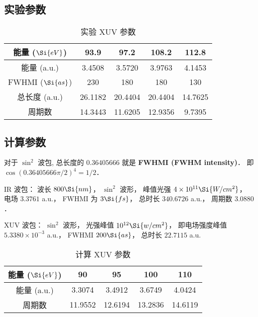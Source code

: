
\subsection{实验参数}
\begin{table}[ht]
\centering
\caption{实验 XUV 参数}\label{Osiand_tab1}
\begin{tabular}{|c|c|c|c|c|}
\hline
能量 ($\Si{eV}$) & 93.9 & 97.2 & 108.2 & 112.8 \\
\hline
能量 (a.u.) & 3.4508 & 3.5720 & 3.9763 & 4.1453 \\
\hline
FWHMI ($\Si{as}$) & 230 & 180 & 180 & 130 \\
\hline
总长度 (a.u.) & 26.1182 & 20.4404 & 20.4404 & 14.7625 \\
\hline
周期数 & 14.3443 & 11.6205 & 12.9356 & 9.7395 \\
\hline
\end{tabular}
\end{table}

\subsection{计算参数}

对于 $\sin^2$ 波包, 总长度的 $0.36405666$ 就是 \textbf{FWHMI (FWHM intensity)}． 即 $\cos(0.36405666 \pi/ 2)^4 = 1/2$．

IR 波包： 波长 $800\Si{nm}$， $\sin^2$ 波形， 峰值光强 $4\times 10^{11} \Si{W/cm^2}$， 电场 $3.3761$ a.u.， FWHMI 为 $3 \Si{fs}$， 总时长 $340.6726$ a.u.， 周期数 $3.0880$．

XUV 波包： $\sin^2$ 波形， 光强峰值 $10^{12} \Si{w/cm^2}$， 即电场强度峰值 $5.3380\times 10^{-3}$ a.u.， FWHMI $200 \Si{as}$， 总时长 $22.7115$ a.u.

\begin{table}[ht]
\centering
\caption{计算 XUV 参数}\label{Osiand_tab2}
\begin{tabular}{|c|c|c|c|c|}
\hline
能量 ($\Si{eV}$) & 90 & 95 & 100 & 110 \\
\hline
能量 (a.u.) & 3.3074 & 3.4912 & 3.6749 & 4.0424\\
\hline
周期数 & 11.9552 & 12.6194 & 13.2836 & 14.6119\\
\hline
\end{tabular}
\end{table}

